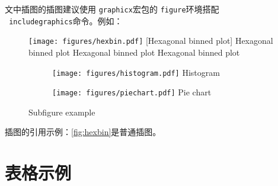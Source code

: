 文中插图的插图建议使用 \texttt{graphicx}宏包的 \texttt{figure}环境搭配 \\ \texttt{ includegraphics}命令。例如：
\begin{figure}[htbp]
	\centering
	\texttt{[image: figures/hexbin.pdf]}
	[Hexagonal binned plot]
    {Hexagonal binned plot Hexagonal binned plot Hexagonal binned plot}
	\label{fig:hexbin}
\end{figure}
\begin{figure}[htbp]
	\centering
    \begin{subfigure}{0.45\textwidth}
        \centering
	    \texttt{[image: figures/histogram.pdf]}
        {Histogram}
    \end{subfigure}
    \begin{subfigure}{0.45\textwidth}
        \centering
	    \texttt{[image: figures/piechart.pdf]}
        {Pie chart}
    \end{subfigure}
    {Subfigure example}
    \label{fig:subfig}
\end{figure}

插图的引用示例：\autoref{fig:hexbin}是普通插图。

\section{表格示例}

